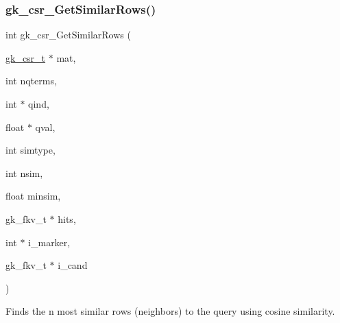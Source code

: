 \subsubsection{\texorpdfstring{gk\+\_\+csr\+\_\+\+Get\+Similar\+Rows()}{gk\_csr\_GetSimilarRows()}}
{\footnotesize\ttfamily int gk\+\_\+csr\+\_\+\+Get\+Similar\+Rows (\begin{DoxyParamCaption}\item[{\hyperlink{a00634}{gk\+\_\+csr\+\_\+t} $\ast$}]{mat,  }\item[{int}]{nqterms,  }\item[{int $\ast$}]{qind,  }\item[{float $\ast$}]{qval,  }\item[{int}]{simtype,  }\item[{int}]{nsim,  }\item[{float}]{minsim,  }\item[{gk\+\_\+fkv\+\_\+t $\ast$}]{hits,  }\item[{int $\ast$}]{i\+\_\+marker,  }\item[{gk\+\_\+fkv\+\_\+t $\ast$}]{i\+\_\+cand }\end{DoxyParamCaption})}

Finds the n most similar rows (neighbors) to the query using cosine similarity.


